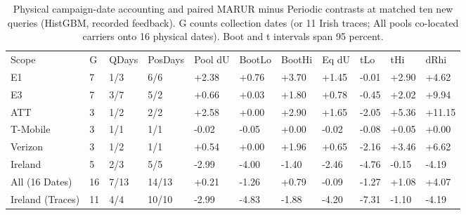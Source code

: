 \begin{table}[!ht]
\centering\footnotesize\setlength{\tabcolsep}{3.5pt}
\caption{Physical campaign-date accounting and paired MARUR minus Periodic contrasts at matched ten new queries (HistGBM, recorded feedback). G counts collection dates (or 11 Irish traces; All pools co-located carriers onto 16 physical dates). Boot and t intervals span 95 percent.}
\begin{tabular}{lllllllllll}
\hline
Scope & G & QDays & PosDays & Pool dU & BootLo & BootHi & Eq dU & tLo & tHi & dRhi \\
E1 & 7 & 1/3 & 6/6 & +2.38 & +0.76 & +3.70 & +1.45 & -0.01 & +2.90 & +4.62 \\
E3 & 7 & 3/7 & 5/2 & +0.66 & +0.03 & +1.80 & +0.78 & -0.45 & +2.02 & +9.94 \\
ATT & 3 & 1/2 & 2/2 & +2.58 & +0.00 & +2.90 & +1.65 & -2.05 & +5.36 & +11.15 \\
T-Mobile & 3 & 1/1 & 1/1 & -0.02 & -0.05 & +0.00 & -0.02 & -0.08 & +0.05 & +0.00 \\
Verizon & 3 & 1/2 & 1/1 & +0.54 & +0.00 & +1.96 & +0.65 & -2.16 & +3.46 & +6.62 \\
Ireland & 5 & 2/3 & 5/5 & -2.99 & -4.00 & -1.40 & -2.46 & -4.76 & -0.15 & -4.19 \\
All (16 Dates) & 16 & 7/13 & 14/13 & +0.21 & -1.26 & +0.79 & -0.09 & -1.27 & +1.08 & +4.07 \\
Ireland (Traces) & 11 & 4/4 & 10/10 & -2.99 & -4.83 & -1.88 & -4.20 & -7.31 & -1.10 & -4.19 \\
\hline
\end{tabular}
\end{table}
